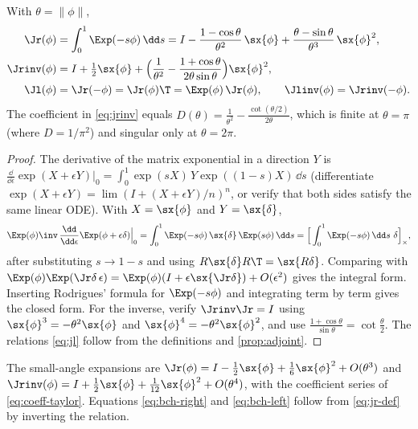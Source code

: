 \begin{theorem}
\label{thm:jr}
With $\theta = \|\phi\|$,
\begin{align}
  \Jr(\phi) &= \int_0^1 \Exp(-s\phi)\,\dd s
             = I - \frac{1-\cos\theta}{\theta^2}\,\sx{\phi} + \frac{\theta - \sin\theta}{\theta^3}\,\sx{\phi}^2, \label{eq:jr}\\
  \Jrinv(\phi) &= I + \tfrac12\sx{\phi} + \Big(\frac{1}{\theta^2} - \frac{1 + \cos\theta}{2\theta\sin\theta}\Big)\sx{\phi}^2, \label{eq:jrinv}\\
  \Jl(\phi) &= \Jr(-\phi) = \Jr(\phi)\T = \Exp(\phi)\,\Jr(\phi), \qquad \Jlinv(\phi) = \Jrinv(-\phi). \label{eq:jl}
\end{align}
The coefficient in \eqref{eq:jrinv} equals $D(\theta) = \frac{1}{\theta^2} - \frac{\cot(\theta/2)}{2\theta}$,
which is finite at $\theta = \pi$ (where $D = 1/\pi^2$) and singular only at $\theta = 2\pi$.
\end{theorem}
\begin{proof}
The derivative of the matrix exponential in a direction $Y$ is
$\frac{\dd}{\dd\epsilon}\exp(X + \epsilon Y)\big|_0 = \int_0^1 \exp(sX)\,Y\exp((1-s)X)\,\dd s$ (differentiate
$\exp(X+\epsilon Y) = \lim(I + (X + \epsilon Y)/n)^n$, or verify that both sides satisfy the same linear ODE). With
$X = \sx{\phi}$ and $Y = \sx{\delta}$,
\begin{equation*}
  \Exp(\phi)\inv\,\frac{\dd}{\dd\epsilon}\Exp(\phi + \epsilon\delta)\Big|_0
  = \int_0^1 \Exp(-s\phi)\,\sx{\delta}\,\Exp(s\phi)\,\dd s
  = \Big[\int_0^1 \Exp(-s\phi)\,\dd s\ \delta\Big]_\times,
\end{equation*}
after substituting $s \to 1 - s$ and using $R\sx{\delta}R\T = \sx{R\delta}$. Comparing with
$\Exp(\phi)\Exp(\Jr\delta\,\epsilon) = \Exp(\phi)(I + \epsilon\sx{\Jr\delta}) + O(\epsilon^2)$ gives the integral form.
Inserting Rodrigues' formula for $\Exp(-s\phi)$ and integrating term by term gives the closed form.
For the inverse, verify $\Jrinv\Jr = I$ using $\sx{\phi}^3 = -\theta^2\sx{\phi}$ and
$\sx{\phi}^4 = -\theta^2\sx{\phi}^2$, and use $\frac{1+\cos\theta}{\sin\theta} = \cot\frac\theta2$. The relations
\eqref{eq:jl} follow from the definitions and \cref{prop:adjoint}.
\end{proof}

The small-angle expansions are $\Jr(\phi) = I - \tfrac12\sx{\phi} + \tfrac16\sx{\phi}^2 + O(\theta^3)$ and
$\Jrinv(\phi) = I + \tfrac12\sx{\phi} + \tfrac1{12}\sx{\phi}^2 + O(\theta^4)$, with the coefficient series of
\eqref{eq:coeff-taylor}. Equations \eqref{eq:bch-right} and \eqref{eq:bch-left} follow from
\eqref{eq:jr-def} by inverting the relation.

